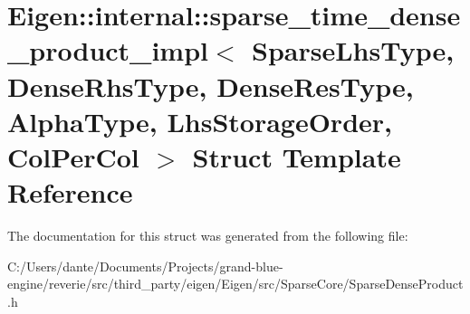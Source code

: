 \hypertarget{struct_eigen_1_1internal_1_1sparse__time__dense__product__impl}{}\section{Eigen\+::internal\+::sparse\+\_\+time\+\_\+dense\+\_\+product\+\_\+impl$<$ Sparse\+Lhs\+Type, Dense\+Rhs\+Type, Dense\+Res\+Type, Alpha\+Type, Lhs\+Storage\+Order, Col\+Per\+Col $>$ Struct Template Reference}
\label{struct_eigen_1_1internal_1_1sparse__time__dense__product__impl}


The documentation for this struct was generated from the following file\+:\begin{DoxyCompactItemize}
\item 
C\+:/\+Users/dante/\+Documents/\+Projects/grand-\/blue-\/engine/reverie/src/third\+\_\+party/eigen/\+Eigen/src/\+Sparse\+Core/Sparse\+Dense\+Product.\+h\end{DoxyCompactItemize}
